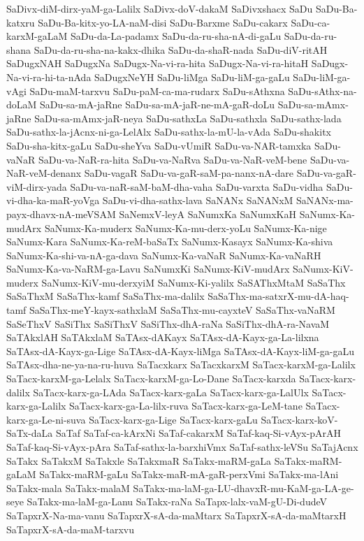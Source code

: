 {SaDivx-diM-dirx-yaM-ga-Lalilx
SaDivx-doV-dakaM
SaDivxshacx
SaDu
SaDu-Ba-katxru
SaDu-Ba-kitx-yo-LA-naM-disi
SaDu-Barxme
SaDu-cakarx
SaDu-ca-karxM-gaLaM
SaDu-da-La-padamx
SaDu-da-ru-sha-nA-di-gaLu
SaDu-da-ru-shana
SaDu-da-ru-sha-na-kakx-dhika
SaDu-da-shaR-nada
SaDu-diV-ritAH
SaDugxNAH
SaDugxNa
SaDugx-Na-vi-ra-hita
SaDugx-Na-vi-ra-hitaH
SaDugx-Na-vi-ra-hi-ta-nAda
SaDugxNeYH
SaDu-liMga
SaDu-liM-ga-gaLu
SaDu-liM-ga-vAgi
SaDu-maM-tarxvu
SaDu-paM-ca-ma-rudarx
SaDu-sAthxna
SaDu-sAthx-na-doLaM
SaDu-sa-mA-jaRne
SaDu-sa-mA-jaR-ne-mA-gaR-doLu
SaDu-sa-mAmx-jaRne
SaDu-sa-mAmx-jaR-neya
SaDu-sathxLa
SaDu-sathxla
SaDu-sathx-lada
SaDu-sathx-la-jAcnx-ni-ga-LelAlx
SaDu-sathx-la-mU-la-vAda
SaDu-shakitx
SaDu-sha-kitx-gaLu
SaDu-sheYva
SaDu-vUmiR
SaDu-va-NAR-tamxka
SaDu-vaNaR
SaDu-va-NaR-ra-hita
SaDu-va-NaRva
SaDu-va-NaR-veM-bene
SaDu-va-NaR-veM-denanx
SaDu-vagaR
SaDu-va-gaR-saM-pa-nanx-nA-dare
SaDu-va-gaR-viM-dirx-yada
SaDu-va-naR-saM-baM-dha-vaha
SaDu-varxta
SaDu-vidha
SaDu-vi-dha-ka-maR-yoVga
SaDu-vi-dha-sathx-lava
SaNANx
SaNANxM
SaNANx-ma-payx-dhavx-nA-meVSAM
SaNemxV-leyA
SaNumxKa
SaNumxKaH
SaNumx-Ka-mudArx
SaNumx-Ka-muderx
SaNumx-Ka-mu-derx-yoLu
SaNumx-Ka-nige
SaNumx-Kara
SaNumx-Ka-reM-baSaTx
SaNumx-Kasayx
SaNumx-Ka-shiva
SaNumx-Ka-shi-va-nA-ga-dava
SaNumx-Ka-vaNaR
SaNumx-Ka-vaNaRH
SaNumx-Ka-va-NaRM-ga-Lavu
SaNumxKi
SaNumx-KiV-mudArx
SaNumx-KiV-muderx
SaNumx-KiV-mu-derxyiM
SaNumx-Ki-yalilx
SaSAThxMtaM
SaSaThx
SaSaThxM
SaSaThx-kamf
SaSaThx-ma-dalilx
SaSaThx-ma-satxrX-mu-dA-haq-tamf
SaSaThx-meY-kayx-sathxlaM
SaSaThx-mu-cayxteV
SaSaThx-vaNaRM
SaSeThxV
SaSiThx
SaSiThxV
SaSiThx-dhA-raNa
SaSiThx-dhA-ra-NavaM
SaTAkxlAH
SaTAkxlaM
SaTAsx-dAKayx
SaTAsx-dA-Kayx-ga-La-lilxna
SaTAsx-dA-Kayx-ga-Lige
SaTAsx-dA-Kayx-liMga
SaTAsx-dA-Kayx-liM-ga-gaLu
SaTAsx-dha-ne-ya-na-ru-huva
SaTacxkarx
SaTacxkarxM
SaTacx-karxM-ga-Lalilx
SaTacx-karxM-ga-Lelalx
SaTacx-karxM-ga-Lo-Dane
SaTacx-karxda
SaTacx-karx-dalilx
SaTacx-karx-ga-LAda
SaTacx-karx-gaLa
SaTacx-karx-ga-LalUlx
SaTacx-karx-ga-Lalilx
SaTacx-karx-ga-La-lilx-ruva
SaTacx-karx-ga-LeM-tane
SaTacx-karx-ga-Le-ni-suva
SaTacx-karx-ga-Lige
SaTacx-karx-gaLu
SaTacx-karx-koV-SaTx-daLa
SaTaf
SaTaf-ca-kArxNi
SaTaf-cakarxM
SaTaf-kaq-Si-vAyx-pArAH
SaTaf-kaq-Si-vAyx-pAra
SaTaf-sathx-la-barxhiVmx
SaTaf-sathx-leVSu
SaTajAcnx
SaTakx
SaTakxM
SaTakxle
SaTakxmaR
SaTakx-maRM-gaLa
SaTakx-maRM-gaLaM
SaTakx-maRM-gaLu
SaTakx-maR-mA-gaR-perxVmi
SaTakx-ma-lAni
SaTakx-mala
SaTakx-malaM
SaTakx-ma-laM-ga-LU-dhavxR-mu-KaM-ga-LA-ge-seye
SaTakx-ma-laM-ga-Lanu
SaTakx-raNa
SaTapx-lalx-vaM-gU-Di-dudeV
SaTapxrX-Na-ma-vanu
SaTapxrX-sA-da-maMtarx
SaTapxrX-sA-da-maMtarxH
SaTapxrX-sA-da-maM-tarxvu
}
